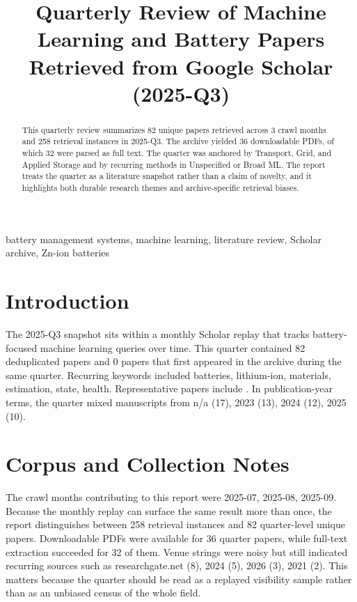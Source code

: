 \documentclass[conference]{IEEEtran}
\begin{document}
\title{ Quarterly Review of Machine Learning and Battery Papers Retrieved from Google Scholar (2025-Q3) }

\author{
}

\maketitle

\begin{abstract}
This quarterly review summarizes 82 unique papers retrieved across 3 crawl months and 258 retrieval instances in 2025-Q3. The archive yielded 36 downloadable PDFs, of which 32 were parsed as full text. The quarter was anchored by Transport, Grid, and Applied Storage and by recurring methods in Unspecified or Broad ML. The report treats the quarter as a literature snapshot rather than a claim of novelty, and it highlights both durable research themes and archive-specific retrieval biases.
\end{abstract}

\begin{IEEEkeywords}
battery management systems, machine learning, literature review, Scholar archive, Zn-ion batteries
\end{IEEEkeywords}

\section{Introduction}
The 2025-Q3 snapshot sits within a monthly Scholar replay that tracks battery-focused machine learning queries over time. This quarter contained 82 deduplicated papers and 0 papers that first appeared in the archive during the same quarter. Recurring keywords included batteries, lithium-ion, materials, estimation, state, health. Representative papers include \cite{stateestimationof2023,textminingfor2022,recentadvancesin2025,section02assessingna}. In publication-year terms, the quarter mixed manuscripts from n/a (17), 2023 (13), 2024 (12), 2025 (10).

\section{Corpus and Collection Notes}
The crawl months contributing to this report were 2025-07, 2025-08, 2025-09. Because the monthly replay can surface the same result more than once, the report distinguishes between 258 retrieval instances and 82 quarter-level unique papers. Downloadable PDFs were available for 36 quarter papers, while full-text extraction succeeded for 32 of them. Venue strings were noisy but still indicated recurring sources such as researchgate.net (8), 2024 (5), 2026 (3), 2021 (2). This matters because the quarter should be read as a replayed visibility sample rather than as an unbiased census of the whole field.
\end{document}

